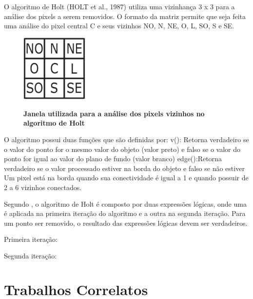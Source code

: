 \documentclass[12pt,oneside,a4paper,english,french,spanish,brazil,]{abntex2}
\begin{document}
O algoritmo de Holt (HOLT et al., 1987) utiliza uma vizinhança 3 x 3 para a análise dos pixels a serem removidos. O formato da matriz permite que seja feita uma análise do pixel central C e seus vizinhos NO, N, NE, O, L, SO, S e SE.

\begin{figure}[ht]
\centering
\caption{\textbf{Janela utilizada para a análise dos pixels vizinhos no algoritmo de Holt}}
\includegraphics[width=0.3\textwidth]{imagens/PDI_Holt_1.PNG}
\label{fig:PDI_Holt_1}
\end{figure}

O algoritmo possui duas funções que são definidas por:
v(): Retorna verdadeiro se o valor do ponto for o mesmo valor do objeto (valor preto) e falso se o valor do ponto for igual ao valor do plano de fundo (valor branco)
edge():Retorna verdadeiro se o valor processado estiver na borda do objeto e falso se não estiver
Um pixel está na borda quando sua conectividade é igual a 1 e quando possuir de 2 a 6 vizinhos conectados. 

Segundo \citet{guilherme:2007}, o algoritmo de Holt é composto por duas expressões lógicas, onde uma é aplicada na primeira iteração do algoritmo e a outra na segunda iteração. Para um ponto ser removido, o resultado das expressões lógicas devem ser verdadeiros.


Primeira iteração: 

Segunda iteração:

\chapter{Trabalhos Correlatos}
\end{document}
